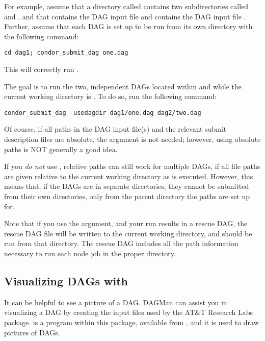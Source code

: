 For example, assume that a directory called 
contains two subdirectories called  and
, and that  contains the DAG input file 
and  contains the DAG input file .
Further, assume that each DAG is set up to be run
from its own directory with the following command:
\begin{verbatim}
cd dag1; condor_submit_dag one.dag
\end{verbatim}
This will correctly run .

The goal is to run the two, independent DAGs located within
 and  while the current working directory
is .  To do so, run the following command:
\begin{verbatim}
condor_submit_dag -usedagdir dag1/one.dag dag2/two.dag
\end{verbatim}

Of course, if all paths in the DAG input file(s) and the relevant submit
description files are absolute,
the  argument is not needed;
however, using absolute paths is NOT generally a good idea.

If you \emph{do not} use , relative paths can still work
for multiple DAGs, if
all file paths are given relative to
the current working directory as  is executed.
However, this means that, if the DAGs are in separate directories, they
cannot be submitted from their own directories, only from the parent
directory the paths are set up for.

Note that if you use the  argument, and your run
results in a rescue DAG, the rescue DAG file will be written to
the current working directory, and should be run from that directory.
The rescue DAG includes all the path information necessary to
run each node job in the proper directory.


\subsection{Visualizing DAGs with }

It can be helpful to see a picture of a DAG.
DAGMan can assist you in visualizing a DAG by creating
the input files used by the AT\&T Research Labs 
 package. 
 is a program within this package,
available from ,
and it is used to draw pictures of DAGs. 


